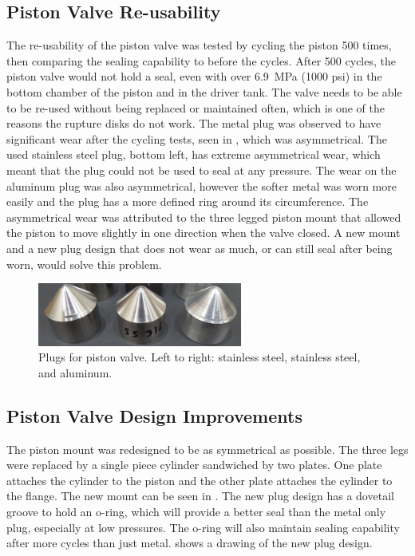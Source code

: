 \subsection{Piston Valve Re-usability} \label{ss:reusability}
The re-usability of the piston valve was tested by cycling the piston 500 times, then comparing the sealing capability to before the cycles. After 500 cycles, the piston valve would not hold a seal, even with over \SI{6.9}{\mega\pascal} (1000 psi) in the bottom chamber of the piston and in the driver tank. The valve needs to be able to be re-used without being replaced or maintained often, which is one of the reasons the rupture disks do not work. The metal plug was observed to have significant wear after the cycling tests, seen in , which was asymmetrical. The used stainless steel plug, bottom left, has extreme asymmetrical wear, which meant that the plug could not be used to seal at any pressure. The wear on the aluminum plug was also asymmetrical, however the softer metal was worn more easily and the plug has a more defined ring around its circumference. The asymmetrical wear was attributed to the three legged piston mount that allowed the piston to move slightly in one direction when the valve closed. A new mount and a new plug design that does not wear as much, or can still seal after being worn, would solve this problem.

\begin{figure}[htbp]
    \vspace{16pt}
    \centering
    \includegraphics[width=0.6\textwidth]{design/photos/plug_gen1_wear_crop.png}
    \caption{Plugs for piston valve. Left to right: stainless steel, stainless steel, and aluminum.}
    \label{fig:plug wear}
    \vspace{16pt}
\end{figure}

\subsection{Piston Valve Design Improvements} \label{ss:new valve}
The piston mount was redesigned to be as symmetrical as possible. The three legs were replaced by a single piece cylinder sandwiched by two plates. One plate attaches the cylinder to the piston and the other plate attaches the cylinder to the flange. The new mount can be seen in . The new plug design has a dovetail groove to hold an o-ring, which will provide a better seal than the metal only plug, especially at low pressures. The o-ring will also maintain sealing capability after more cycles than just metal.  shows a drawing of the new plug design.

